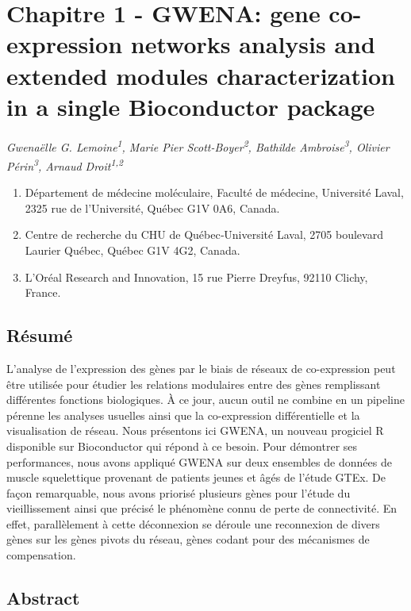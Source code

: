 \chapter{Chapitre 1 - GWENA: gene co-expression networks analysis and extended modules characterization in a single Bioconductor package}
\label{chapter:gwena}

\textit{Gwenaëlle G. Lemoine\textsuperscript{1}, Marie Pier Scott-Boyer\textsuperscript{2}, Bathilde Ambroise\textsuperscript{3}, Olivier Périn\textsuperscript{3}, Arnaud Droit\textsuperscript{1,2}}

{\footnotesize
\begin{enumerate}[leftmargin=15pt]
  \item Département de médecine moléculaire, Faculté de médecine, Université Laval, 2325 rue de l’Université, Québec G1V 0A6, Canada.
  \item Centre de recherche du CHU de Québec‑Université Laval, 2705 boulevard Laurier Québec, Québec G1V 4G2, Canada.
  \item L’Oréal Research and Innovation, 15 rue Pierre Dreyfus, 92110 Clichy, France.
\end{enumerate}
}



\section{Résumé}

L'analyse de l'expression des gènes par le biais de réseaux de co-expression peut être utilisée pour étudier les relations modulaires entre des gènes remplissant différentes fonctions biologiques. À ce jour, aucun outil ne combine en un pipeline pérenne les analyses usuelles ainsi que la co-expression différentielle et la visualisation de réseau. Nous présentons ici GWENA, un nouveau progiciel R disponible sur Bioconductor qui répond à ce besoin. Pour démontrer ses performances, nous avons appliqué GWENA sur deux ensembles de données de muscle squelettique provenant de patients jeunes et âgés de l'étude GTEx. De façon remarquable, nous avons priorisé plusieurs gènes pour l'étude du vieillissement ainsi que précisé le phénomène connu de perte de connectivité. En effet, parallèlement à cette déconnexion se déroule une reconnexion de divers gènes sur les gènes pivots du réseau, gènes codant pour des mécanismes de compensation.


\section{Abstract}
